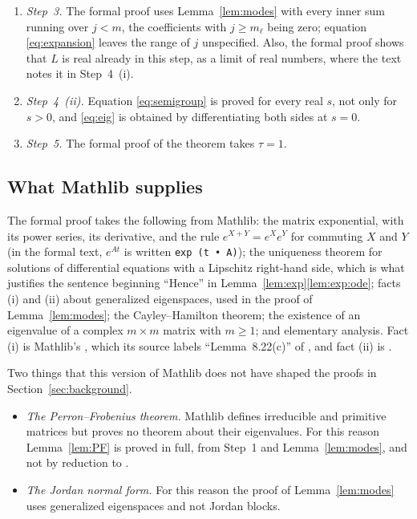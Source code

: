 \documentclass[11pt]{article}
\theoremstyle{definition}
\theoremstyle{remark}
\begin{document}
\begin{enumerate}[label=\textup{\arabic*.}, leftmargin=2em]
        formal proof does not expand the power. It proves the two implications by induction: if
        $[P^k]_{ij} \ne 0$ then $i$ is reachable from $j$, by induction on $k$
        (); and if $i$ is reachable from $j$ then
        $[P^k]_{ij} > 0$ for some $k$, by induction on the number of arcs
        ().
  \item \emph{Step~3.} The formal proof uses Lemma~\ref{lem:modes} with every inner sum running
        over $j < m$, the coefficients with $j \ge m_\ell$ being zero; equation
        \eqref{eq:expansion} leaves the range of $j$ unspecified. Also, the formal proof shows
        that $L$ is real already in this step, as a limit of real numbers, where the text notes
        it in Step~4~(i).
  \item \emph{Step~4~(ii).} Equation \eqref{eq:semigroup} is proved for every real $s$, not only
        for $s > 0$, and \eqref{eq:eig} is obtained by differentiating both sides at $s = 0$.
  \item \emph{Step~5.} The formal proof of the theorem takes $\tau = 1$.
\end{enumerate}

\subsection{What Mathlib supplies}\label{sec:lean:mathlib}

The formal proof takes the following from Mathlib: the matrix exponential, with its power series,
its derivative, and the rule $e^{X + Y} = e^{X} e^{Y}$ for commuting $X$ and $Y$ (in the formal
text, $e^{At}$ is written \verb|exp (t • A)|); the uniqueness theorem for solutions of
differential equations with a Lipschitz right-hand side, which is what justifies the sentence
beginning ``Hence'' in Lemma~\ref{lem:exp}\ref{lem:exp:ode}; facts (i) and (ii) about generalized
eigenspaces, used in the proof of Lemma~\ref{lem:modes}; the Cayley--Hamilton theorem; the
existence of an eigenvalue of a complex $m \times m$ matrix with $m \ge 1$; and elementary
analysis.
Fact (i) is Mathlib's , which its source labels
``Lemma~8.22(c)'' of \cite{Axler}, and fact (ii) is .

Two things that this version of Mathlib does not have shaped the proofs in
Section~\ref{sec:background}.
\begin{itemize}[leftmargin=2em]
  \item \emph{The Perron--Frobenius theorem.} Mathlib defines irreducible and primitive matrices
        but proves no theorem about their eigenvalues. For this reason Lemma~\ref{lem:PF} is
        proved in full, from Step~1 and Lemma~\ref{lem:modes}, and not by reduction to
        \cite[Theorem~8.3.1]{HJ}.
  \item \emph{The Jordan normal form.} For this reason the proof of Lemma~\ref{lem:modes} uses
        generalized eigenspaces and not Jordan blocks.
\end{itemize}
\end{document}
